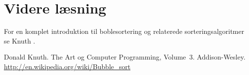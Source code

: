\documentclass[10pt,a4paper]{article}
\begin{document}
\section{Videre læsning}
For en komplet introduktion til boblesortering og relaterede sorteringsalgoritmer se Knuth \cite{pa}.

\begin{thebibliography}{99}
 Donald Knuth. The Art og Computer Programming, Volume~3. Addison-Wesley.
 \url{http://en.wikipedia.org/wiki/Bubble_sort}
\end{thebibliography}
\end{document}
